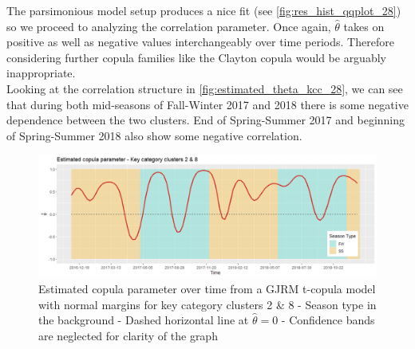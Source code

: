 The parsimonious model setup produces a nice fit (see \autoref{fig:res_hist_qqplot_28}) so we proceed to analyzing the correlation parameter. Once again, $\hat{\theta}$ takes on positive as well as negative values interchangeably over time periods. Therefore considering further copula families like the Clayton copula would be arguably inappropriate.
\\

Looking at the correlation structure in \autoref{fig:estimated_theta_kcc_28}, we can see that during both mid-seasons of Fall-Winter 2017 and 2018 there is some negative dependence between the two clusters. End of Spring-Summer 2017 and beginning of Spring-Summer 2018 also show some negative correlation.


\begin{figure}[H]
\centering
  \includegraphics[width=0.95\linewidth]{figures/estimated_theta_kcc_28.png}
  \caption{Estimated copula parameter over time from a \ac{GJRM} t-copula model with normal margins for key category clusters 2 \& 8 - Season type in the background - Dashed horizontal line at $\hat{\theta} = 0$ - Confidence bands are neglected for clarity of the graph}
  \label{fig:estimated_theta_kcc_28}
\end{figure}















